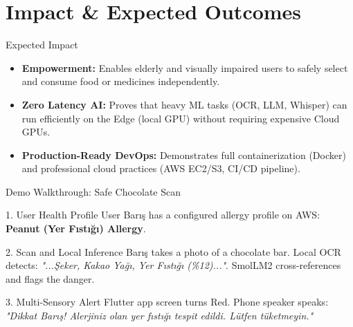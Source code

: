 \section{Impact \& Expected Outcomes}

\begin{frame}{Expected Impact}
    \begin{itemize}
        \item \textbf{Empowerment:} Enables elderly and visually impaired users to safely select and consume food or medicines independently.
        \item \textbf{Zero Latency AI:} Proves that heavy ML tasks (OCR, LLM, Whisper) can run efficiently on the Edge (local GPU) without requiring expensive Cloud GPUs.
        \item \textbf{Production-Ready DevOps:} Demonstrates full containerization (Docker) and professional cloud practices (AWS EC2/S3, CI/CD pipeline).
    \end{itemize}
\end{frame}

\begin{frame}{Demo Walkthrough: Safe Chocolate Scan}
    \begin{block}{1. User Health Profile}
        User Barış has a configured allergy profile on AWS: \textbf{Peanut (Yer Fıstığı) Allergy}.
    \end{block}
    \begin{block}{2. Scan and Local Inference}
        Barış takes a photo of a chocolate bar. Local OCR detects: \textit{"...Şeker, Kakao Yağı, Yer Fıstığı (\%12)..."}. SmolLM2 cross-references and flags the danger.
    \end{block}
    \begin{block}{3. Multi-Sensory Alert}
        Flutter app screen turns Red. Phone speaker speaks: \textit{"Dikkat Barış! Alerjiniz olan yer fıstığı tespit edildi. Lütfen tüketmeyin."}
    \end{block}
\end{frame}
